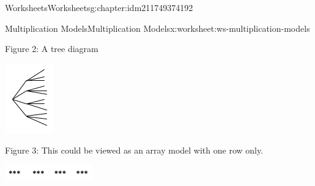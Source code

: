\documentclass[twoside,11pt,]{book}
\begin{document}
\begin{chapterptx}{Worksheets}{}{Worksheets}{}{}{g:chapter:idm211749374192}
\begin{worksheet-section-numberless}{Multiplication Models}{}{Multiplication Models}{}{}{x:worksheet:ws-multiplication-models}
\begin{introduction}{}
\begin{description}
\begin{sidebyside}{1}{0.45}{0.45}{0}
\end{sidebyside}%
\item[{}]Figure 2: A tree diagram \begin{sidebyside}{1}{0.45}{0.45}{0}%
\begin{sbspanel}{0.1}%
\includegraphics[width=1\linewidth]{images/mult-tree.png}
\end{sbspanel}%
\end{sidebyside}%
\item[{}]Figure 3: This could be viewed as an array model with one row only. \begin{sidebyside}{1}{0.3}{0.3}{0}%
\begin{sbspanel}{0.4}%
\includegraphics[width=1\linewidth]{images/mult-one-row.png}

\end{sbspanel}
\end{sidebyside}
\end{description}
\end{introduction}
\end{worksheet-section-numberless}
\end{chapterptx}
\end{document}
